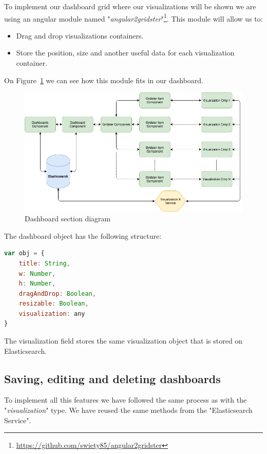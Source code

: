 \documentclass[a4paper, 12pt, english]{book}
\begin{document}
To implement our dashboard grid where our visualizations will be shown we are using an angular module named "\textit{angular2gridster}"\footnote{\url{https://github.com/swiety85/angular2gridster}}. This module will allow us to:
\begin{itemize}
    \item Drag and drop visualizations containers.
    \item Store the position, size and another useful data for each visualization container.
\end{itemize}

On Figure~\ref{fig:dashboards-diagram} we can see how this module fits in our dashboard.
\begin{figure}
  \centering
  \includegraphics[width=15cm, keepaspectratio]{img/dashboards-diagram}
  \caption{Dashboard section diagram}
  \label{fig:dashboards-diagram}
\end{figure}

The dashboard object has the following structure:
\begin{lstlisting}[language=javascript, caption=Dashboard object structure, label=code:dashboard-object]
var obj = {
    title: String,
    w: Number,
    h: Number,
    dragAndDrop: Boolean,
    resizable: Boolean,
    visualization: any
}
\end{lstlisting}

The visualization field stores the same visualization object that is stored on Elasticsearch.

\subsection{Saving, editing and deleting dashboards}
\label{sec:visualizations-dashboard}
To implement all this features we have followed the same process as with the "\textit{visualization}" type. We have reused the same methods from the "Elasticsearch Service".
\end{document}
